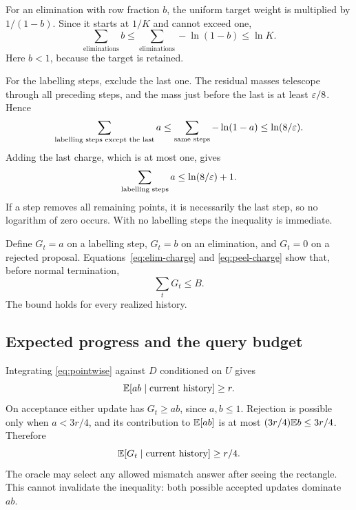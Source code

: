 For an elimination with row fraction $b$, the uniform target weight is multiplied by $1/(1-b)$. Since it starts at $1/K$ and cannot exceed one,
\begin{equation}
 \sum_{\text{eliminations}}b
 \le\sum_{\text{eliminations}}-\ln(1-b)
 \le\ln K.
\label{eq:elim-charge}
\end{equation}
Here $b<1$, because the target is retained.

For the labelling steps, exclude the last one. The residual masses telescope through all preceding steps, and the mass just before the last is at least $\varepsilon/8$. Hence
\[
 \sum_{\text{labelling steps except the last}}a
 \le\sum_{\text{same steps}}-\ln(1-a)
 \le\ln(8/\varepsilon).
\]
Adding the last charge, which is at most one, gives
\begin{equation}
 \sum_{\text{labelling steps}}a\le\ln(8/\varepsilon)+1.
\label{eq:peel-charge}
\end{equation}
If a step removes all remaining points, it is necessarily the last step, so no logarithm of zero occurs. With no labelling steps the inequality is immediate.

Define $G_t=a$ on a labelling step, $G_t=b$ on an elimination, and $G_t=0$ on a rejected proposal. Equations~\eqref{eq:elim-charge} and \eqref{eq:peel-charge} show that, before normal termination,
\begin{equation}
 \sum_t G_t\le B.
\label{eq:total-charge}
\end{equation}
The bound holds for every realized history.

\subsection{Expected progress and the query budget}
Integrating \eqref{eq:pointwise} against $D$ conditioned on $U$ gives
\[
 \mathbb E[ab\mid\text{current history}]\ge r.
\]
On acceptance either update has $G_t\ge ab$, since $a,b\le1$. Rejection is possible only when $a<3r/4$, and its contribution to $\mathbb E[ab]$ is at most $(3r/4)\mathbb E b\le3r/4$. Therefore
\begin{equation}
 \mathbb E[G_t\mid\text{current history}]\ge r/4.
\label{eq:drift-app}
\end{equation}
The oracle may select any allowed mismatch answer after seeing the rectangle. This cannot invalidate the inequality: both possible accepted updates dominate $ab$.

